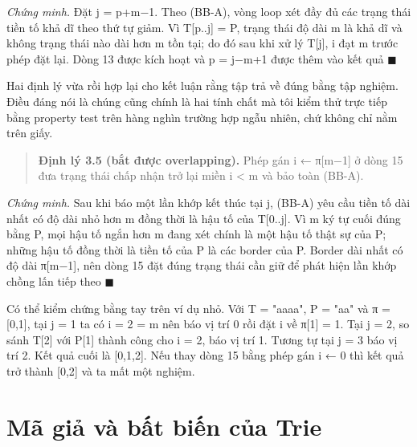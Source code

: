 \emph{Chứng minh.} Đặt j = p+m−1. Theo (BB-A), vòng loop xét đầy đủ các
trạng thái tiền tố khả dĩ theo thứ tự giảm. Vì T{[}p..j{]} = P, trạng
thái độ dài m là khả dĩ và không trạng thái nào dài hơn m tồn tại; do đó
sau khi xử lý T{[}j{]}, i đạt m trước phép đặt lại. Dòng 13 được kích
hoạt và p = j−m+1 được thêm vào kết quả \(\blacksquare\)

Hai định lý vừa rồi hợp lại cho kết luận rằng tập trả về đúng bằng tập
nghiệm. Điều đáng nói là chúng cũng chính là hai tính chất mà tôi kiểm
thử trực tiếp bằng property test trên hàng nghìn trường hợp ngẫu nhiên,
chứ không chỉ nằm trên giấy.

\begin{quote}
\textbf{Định lý 3.5 (bắt được overlapping).} Phép gán i ← π{[}m−1{]} ở
dòng 15 đưa trạng thái chấp nhận trở lại miền i \textless{} m và bảo
toàn (BB-A).
\end{quote}

\emph{Chứng minh.} Sau khi báo một lần khớp kết thúc tại j, (BB-A) yêu
cầu tiền tố dài nhất có độ dài nhỏ hơn m đồng thời là hậu tố của
T{[}0..j{]}. Vì m ký tự cuối đúng bằng P, mọi hậu tố ngắn hơn m đang xét
chính là một hậu tố thật sự của P; những hậu tố đồng thời là tiền tố của
P là các border của P. Border dài nhất có độ dài π{[}m−1{]}, nên dòng 15
đặt đúng trạng thái cần giữ để phát hiện lần khớp chồng lấn tiếp theo \(\blacksquare\)

Có thể kiểm chứng bằng tay trên ví dụ nhỏ. Với T = "aaaa", P = "aa" và π
= {[}0,1{]}, tại j = 1 ta có i = 2 = m nên báo vị trí 0 rồi đặt i về
π{[}1{]} = 1. Tại j = 2, so sánh T{[}2{]} với P{[}1{]} thành công cho i
= 2, báo vị trí 1. Tương tự tại j = 3 báo vị trí 2. Kết quả cuối là
{[}0,1,2{]}. Nếu thay dòng 15 bằng phép gán i ← 0 thì kết quả trở thành
{[}0,2{]} và ta mất một nghiệm.

\section{Mã giả và bất biến của Trie}
\label{sec:3-4}

